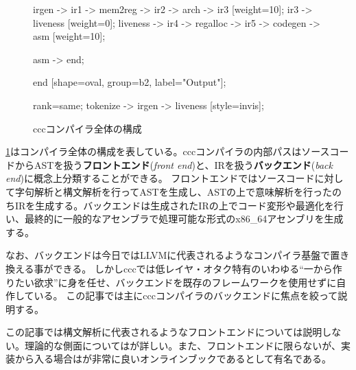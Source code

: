 \documentclass[../main.tex]{subfiles}
\begin{document}
\begin{figure}[!ht]
\begin{center}
{{        irgen -> ir1 -> mem2reg -> ir2 -> arch -> ir3  [weight=10];
        ir3 -> liveness [weight=0];
        liveness -> ir4 -> regalloc -> ir5 -> codegen -> asm [weight=10];

      }
      asm -> end;

      end [shape=oval, group=b2, label="Output"];

      { rank=same; tokenize -> irgen -> liveness [style=invis]; }
    }
    \caption{cccコンパイラ全体の構成}
    \label{ccc_arch}
  \end{center}
\end{figure}

\cref{ccc_arch}はコンパイラ全体の構成を表している。cccコンパイラの内部パスはソースコードからASTを扱う\textbf{フロントエンド}(\textit{front end})と、IRを扱う\textbf{バックエンド}(\textit{back end})に概念上分類することができる。
フロントエンドではソースコードに対して字句解析と構文解析を行ってASTを生成し、ASTの上で意味解析を行ったのちIRを生成する。バックエンドは生成されたIRの上でコード変形や最適化を行い、最終的に一般的なアセンブラで処理可能な形式のx86\_64アセンブリを生成する。

なお、バックエンドは今日ではLLVM\cite{TheLLVM}に代表されるようなコンパイラ基盤で置き換える事ができる。
しかしcccでは低レイヤ・オタク特有のいわゆる``一から作りたい欲求''に身を任せ、バックエンドを既存のフレームワークを使用せずに自作している。
この記事では主にcccコンパイラのバックエンドに焦点を絞って説明する。

この記事では構文解析に代表されるようなフロントエンドについては説明しない。理論的な側面については\cite{av2009コンパイラ}が詳しい。また、フロントエンドに限らないが、実装から入る場合は\cite{ruicompilerbook}が非常に良いオンラインブックであるとして有名である。
\end{document}
